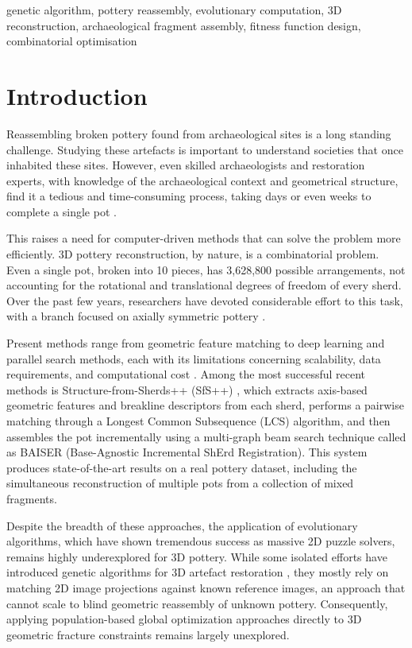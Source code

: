\documentclass[conference]{IEEEtran}
\begin{document}
\begin{IEEEkeywords}
genetic algorithm, pottery reassembly, evolutionary computation, 3D reconstruction, archaeological fragment assembly, fitness function design, combinatorial optimisation
\end{IEEEkeywords}

\section{Introduction}
Reassembling broken pottery found from archaeological sites is a long standing challenge. Studying these artefacts is important to understand societies that once inhabited these sites. However, even skilled archaeologists and restoration experts, with knowledge of the archaeological context and geometrical structure, find it a tedious and time-consuming process, taking days or even weeks to complete a single pot \cite{b1}.

This raises a need for computer-driven methods that can solve the problem more efficiently. 3D pottery reconstruction, by nature, is a combinatorial problem. Even a single pot, broken into 10 pieces, has 3,628,800 possible arrangements, not accounting for the rotational and translational degrees of freedom of every sherd. Over the past few years, researchers have devoted considerable effort to this task, with a branch focused on axially symmetric pottery \cite{b2}.

Present methods range from geometric feature matching to deep learning and parallel search methods, each with its limitations concerning scalability, data requirements, and computational cost \cite{b1}. Among the most successful recent methods is Structure-from-Sherds++ (SfS++) \cite{b2}, which extracts axis-based geometric features and breakline descriptors from each sherd, performs a pairwise matching through a Longest Common Subsequence (LCS) algorithm, and then assembles the pot incrementally using a multi-graph beam search technique called as BAISER (Base-Agnostic Incremental ShErd Registration). This system produces state-of-the-art results on a real pottery dataset, including the simultaneous reconstruction of multiple pots from a collection of mixed fragments.

Despite the breadth of these approaches, the application of evolutionary algorithms, which have shown tremendous success as massive 2D puzzle solvers, remains highly underexplored for 3D pottery. While some isolated efforts have introduced genetic algorithms for 3D artefact restoration \cite{b17}, they mostly rely on matching 2D image projections against known reference images, an approach that cannot scale to blind geometric reassembly of unknown pottery. Consequently, applying population-based global optimization approaches directly to 3D geometric fracture constraints remains largely unexplored.
\end{document}
